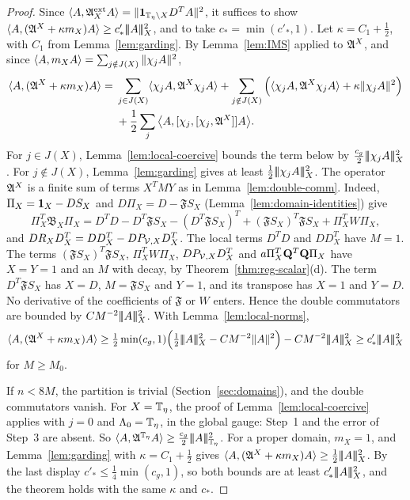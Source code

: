 \begin{proof}
Since $\langle A,\mathfrak A^{\rm ext}_XA\rangle=\|\mathbf 1_{\mathbb T_\eta\setminus X}D^TA\|^2$, it suffices to show $\langle A,(\mathfrak A^X+\kappa m_X)A\rangle\ge c'_*|\!|\!|A|\!|\!|_X^2$, and to take $c_*=\min(c'_*,1)$. Let $\kappa=C_1+\frac12$, with $C_1$ from Lemma~\ref{lem:garding}. By Lemma~\ref{lem:IMS} applied to $\mathfrak A^X$, and since $\langle A,m_XA\rangle=\sum_{j\notin J(X)}\|\chi_jA\|^2$,
\[
\begin{aligned}
\langle A,(\mathfrak A^X+\kappa m_X)A\rangle={}&\sum_{j\in J(X)}\langle \chi_jA,\mathfrak A^X\chi_jA\rangle+\sum_{j\notin J(X)}\Big(\langle \chi_jA,\mathfrak A^X\chi_jA\rangle+\kappa\|\chi_jA\|^2\Big)\\
&+\frac12\sum_j\big\langle A,[\chi_j,[\chi_j,\mathfrak A^X]]A\big\rangle .
\end{aligned}
\]
For $j\in J(X)$, Lemma~\ref{lem:local-coercive} bounds the term below by $\frac{c_g}2|\!|\!|\chi_jA|\!|\!|_X^2$. For $j\notin J(X)$, Lemma~\ref{lem:garding} gives at least $\frac12|\!|\!|\chi_jA|\!|\!|_X^2$. The operator $\mathfrak A^X$ is a finite sum of terms $X^TMY$ as in Lemma~\ref{lem:double-comm}. Indeed, $\Pi_X=\mathbf 1_X-DS_X$ and $D\Pi_X=D-\mathfrak FS_X$ (Lemma~\ref{lem:domain-identities}) give
\[
\Pi_X^T\mathfrak B_X\Pi_X=D^TD-D^T\mathfrak FS_X-(D^T\mathfrak FS_X)^T+(\mathfrak FS_X)^T\mathfrak FS_X+\Pi_X^TW\Pi_X ,
\]
and $DR_XD^T_X=DD^T_X-DP_{\mathcal V,X}D^T_X$. The local terms $D^TD$ and $DD^T_X$ have $M=1$. The terms $(\mathfrak FS_X)^T\mathfrak FS_X$, $\Pi_X^TW\Pi_X$, $DP_{\mathcal V,X}D^T_X$ and $a\Pi_X^T\mathbf Q^T\mathbf Q\Pi_X$ have $X=Y=1$ and an $M$ with decay, by Theorem~\ref{thm:reg-scalar}(d). The term $D^T\mathfrak FS_X$ has $X=D$, $M=\mathfrak FS_X$ and $Y=1$, and its transpose has $X=1$ and $Y=D$. No derivative of the coefficients of $\mathfrak F$ or $W$ enters. Hence the double commutators are bounded by $CM^{-2}|\!|\!|A|\!|\!|_X^2$. With Lemma~\ref{lem:local-norms},
\[
\ip A{(\fA^X+\kappa m_X)A}\ge\tfrac12\min(c_g,1)\Big(\tfrac12\tn A_X^2-CM^{-2}\|A\|^2\Big)-CM^{-2}\tn A_X^2\ge c'_*\tn A_X^2
\]
for $M\ge M_0$.

If $n<8M$, the partition is trivial (Section~\ref{sec:domains}), and the double commutators vanish. For $X=\mathbb T_\eta$, the proof of Lemma~\ref{lem:local-coercive} applies with $j=0$ and $\Lambda_0=\mathbb T_\eta$, in the global gauge: Step~1 and the error of Step~3 are absent. So $\langle A,\mathfrak A^{\mathbb T_\eta}A\rangle\ge\frac{c_g}2|\!|\!|A|\!|\!|_{\mathbb T_\eta}^2$. For a proper domain, $m_X=1$, and Lemma~\ref{lem:garding} with $\kappa=C_1+\frac12$ gives $\langle A,(\mathfrak A^X+\kappa m_X)A\rangle\ge\frac12|\!|\!|A|\!|\!|_X^2$. By the last display $c'_*\le\frac14\min(c_g,1)$, so both bounds are at least $c'_*|\!|\!|A|\!|\!|_X^2$, and the theorem holds with the same $\kappa$ and $c_*$.
\end{proof}

